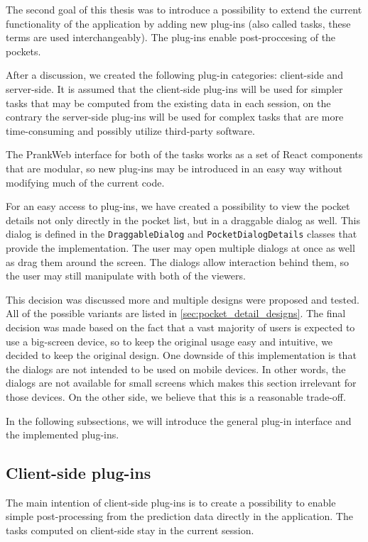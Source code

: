 The second goal of this thesis was to introduce a possibility to extend the current functionality of the application by adding new plug-ins (also called tasks, these terms are used interchangeably). The plug-ins enable post-proccesing of the pockets. 

After a discussion, we created the following plug-in categories: client-side and server-side. It is assumed that the client-side plug-ins will be used for simpler tasks that may be computed from the existing data in each session, on the contrary the server-side plug-ins will be used for complex tasks that are more time-consuming and possibly utilize third-party software.

The PrankWeb interface for both of the tasks works as a set of React components that are modular, so new plug-ins may be introduced in an easy way without modifying much of the current code.

For an easy access to plug-ins, we have created a possibility to view the pocket details not only directly in the pocket list, but in a draggable dialog as well. This dialog is defined in the \texttt{DraggableDialog} and \texttt{PocketDialogDetails} classes that provide the implementation. The user may open multiple dialogs at once as well as drag them around the screen. The dialogs allow interaction behind them, so the user may still manipulate with both of the viewers.

This decision was discussed more and multiple designs were proposed and tested. All of the possible variants are listed in \cref{sec:pocket_detail_designs}. The final decision was made based on the fact that a vast majority of users is expected to use a big-screen device, so to keep the original usage easy and intuitive, we decided to keep the original design. One downside of this implementation is that the dialogs are not intended to be used on mobile devices. In other words, the dialogs are not available for small screens which makes this section irrelevant for those devices. On the other side, we believe that this is a reasonable trade-off.

In the following subsections, we will introduce the general plug-in interface and the implemented plug-ins.

\subsection{Client-side plug-ins}
\label{subsec:client-side-plugins}

The main intention of client-side plug-ins is to create a possibility to enable simple post-processing from the prediction data directly in the application. The tasks computed on client-side stay in the current session. 

